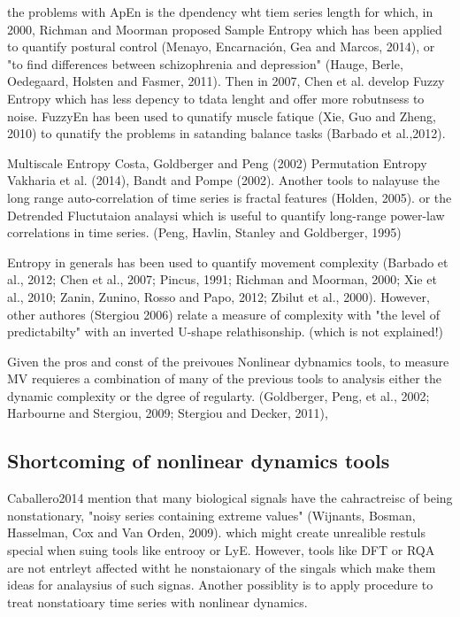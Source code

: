 the problems with ApEn is the dpendency wht tiem series length for which,
in 2000, Richman and Moorman proposed Sample Entropy which has been applied 
to quantify postural control  (Menayo, Encarnación, Gea and Marcos, 2014),
or 
"to find differences between schizophrenia and depression"
(Hauge, Berle, Oedegaard, Holsten and Fasmer, 2011).
Then in 2007, Chen et al. develop Fuzzy Entropy which has less
depency to tdata lenght and offer more robutnsess to noise.
FuzzyEn has been used to qunatify muscle fatique 
(Xie, Guo and Zheng, 2010)
to qunatify the problems in satanding  balance tasks 
(Barbado et al.,2012).


Multiscale Entropy Costa, Goldberger and Peng (2002)
Permutation Entropy Vakharia et al. (2014),
Bandt and Pompe (2002).
Another tools to nalayuse the long range auto-correlation 
of time series is fractal features
(Holden, 2005).
or the Detrended Fluctutaion analaysi which is useful
to quantify long-range power-law correlations in time series.
(Peng, Havlin, Stanley and Goldberger, 1995)


Entropy in generals has been used to quantify movement complexity
(Barbado et al., 2012; Chen et al., 2007; Pincus, 1991;
Richman and Moorman, 2000; Xie et al., 2010; Zanin, Zunino, Rosso and Papo,
2012; Zbilut et al., 2000).
However, other authores (Stergiou 2006) relate a measure of 
complexity with "the level of predictabilty"
with an inverted U-shape relathisonship. 
(which is not explained!)

Given the pros and const of the preivoues Nonlinear dybnamics tools,
to measure MV requieres a combination of many of the previous tools
to analysis either the dynamic complexity or the dgree of regularty.
(Goldberger, Peng, et al., 2002; Harbourne and Stergiou, 2009;
Stergiou and Decker, 2011),



\subsection{Shortcoming of nonlinear dynamics tools}



Caballero2014 mention that many biological signals have 
the cahractreisc of being nonstationary, 
"noisy series containing extreme values"
(Wijnants, Bosman, Hasselman, Cox and Van Orden, 2009).
which might create unrealible restuls special when suing 
tools like entrooy or LyE. However, tools like DFT or RQA are not
entrleyt affected witht he nonstaionary of the singals
which make them ideas for analaysius of such signas.
Another possiblity is to apply procedure to treat 
nonstatioary time series with nonlinear dynamics.

